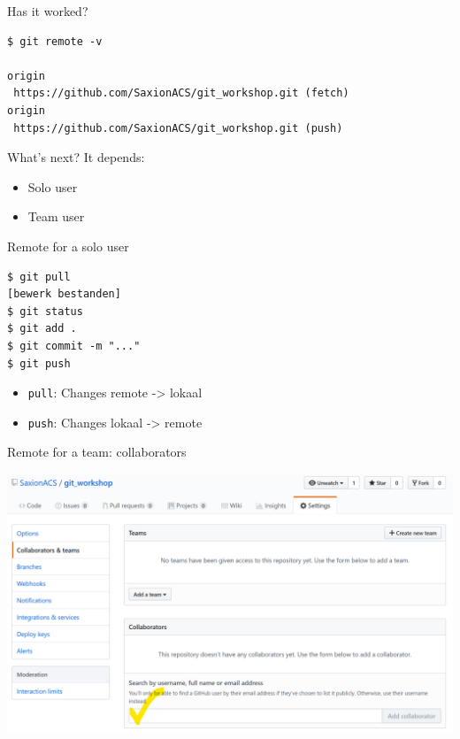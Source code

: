 \documentclass[
  11pt,
  american,
  ignorenonframetext,
  aspectratio=43,
  compress,
  xcolor=dvipsnames]{beamer}
\providecommand{\tightlist}{%
  \setlength{\itemsep}{0pt}\setlength{\parskip}{0pt}}
\begin{document}
\begin{frame}[fragile]{Has it worked?}
\protect\hypertarget{has-it-worked-1}{}
\begin{verbatim}
$ git remote -v

origin  
 https://github.com/SaxionACS/git_workshop.git (fetch)
origin  
 https://github.com/SaxionACS/git_workshop.git (push)
\end{verbatim}
\end{frame}

\begin{frame}{What's next?}
\protect\hypertarget{whats-next}{}
It depends:

\begin{itemize}
\tightlist
\item
  Solo user
\item
  Team user
\end{itemize}
\end{frame}

\begin{frame}[fragile]{Remote for a solo user}
\protect\hypertarget{remote-for-a-solo-user}{}
\begin{verbatim}
$ git pull
[bewerk bestanden]
$ git status
$ git add .
$ git commit -m "..."
$ git push
\end{verbatim}

\begin{itemize}
\tightlist
\item
  \texttt{pull}: Changes remote -\textgreater{} lokaal
\item
  \texttt{push}: Changes lokaal -\textgreater{} remote
\end{itemize}
\end{frame}

\begin{frame}{Remote for a team: collaborators}
\protect\hypertarget{remote-for-a-team-collaborators}{}
\begin{center}
\includegraphics[width=1.0\textwidth]{./images/github_collab.png}
\end{center}
\end{frame}
\end{document}
